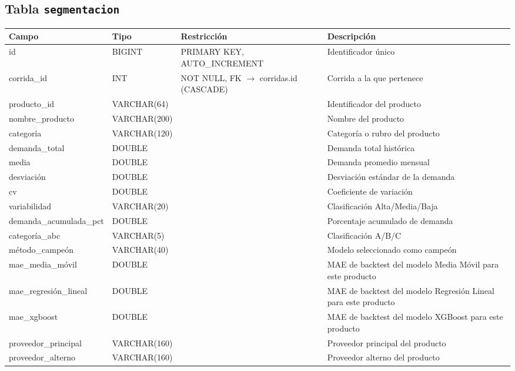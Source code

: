 \subsection*{Tabla \texttt{segmentacion}}
\begin{table}[H]
\centering
\renewcommand{\arraystretch}{1.3}
\begin{tabularx}{\textwidth}{|>{\raggedright\arraybackslash}p{3.0cm}|l|>{\raggedright\arraybackslash}p{3.2cm}|X|}
\hline
\textbf{Campo} & \textbf{Tipo} & \textbf{Restricción} & \textbf{Descripción} \\
\hline
id & BIGINT & PRIMARY KEY, AUTO\_\discretionary{}{}{}INCREMENT & Identificador único \\
\hline
corrida\_\discretionary{}{}{}id & INT & NOT NULL, FK $\to$ corridas.id (CASCADE) & Corrida a la que pertenece \\
\hline
producto\_\discretionary{}{}{}id & VARCHAR(64) & & Identificador del producto \\
\hline
nombre\_\discretionary{}{}{}producto & VARCHAR(200) & & Nombre del producto \\
\hline
categoría & VARCHAR(120) & & Categoría o rubro del producto \\
\hline
demanda\_\discretionary{}{}{}total & DOUBLE & & Demanda total histórica \\
\hline
media & DOUBLE & & Demanda promedio mensual \\
\hline
desviación & DOUBLE & & Desviación estándar de la demanda \\
\hline
cv & DOUBLE & & Coeficiente de variación \\
\hline
variabilidad & VARCHAR(20) & & Clasificación Alta/Media/Baja \\
\hline
demanda\_\discretionary{}{}{}acumulada\_\discretionary{}{}{}pct & DOUBLE & & Porcentaje acumulado de demanda \\
\hline
categoría\_\discretionary{}{}{}abc & VARCHAR(5) & & Clasificación A/B/C \\
\hline
método\_\discretionary{}{}{}campeón & VARCHAR(40) & & Modelo seleccionado como campeón \\
\hline
mae\_\discretionary{}{}{}media\_\discretionary{}{}{}móvil & DOUBLE & & MAE de backtest del modelo Media Móvil para este producto \\
\hline
mae\_\discretionary{}{}{}regresión\_\discretionary{}{}{}lineal & DOUBLE & & MAE de backtest del modelo Regresión Lineal para este producto \\
\hline
mae\_\discretionary{}{}{}xgboost & DOUBLE & & MAE de backtest del modelo XGBoost para este producto \\
\hline
proveedor\_\discretionary{}{}{}principal & VARCHAR(160) & & Proveedor principal del producto \\
\hline
proveedor\_\discretionary{}{}{}alterno & VARCHAR(160) & & Proveedor alterno del producto \\
\hline
\end{tabularx}
\end{table}


